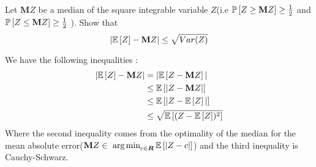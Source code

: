 \begin{exercise}{}
	Let $ \textbf{M}Z $ be a median of the square integrable variable $ Z $(i.e $ \mathbb{P}\left[Z\geq \textbf{M}Z\right] \geq \frac{1}{2} $ and $ \mathbb{P}\left[Z\leq \textbf{M}Z\right] \geq \frac{1}{2}$ ). Show that 
\begin{equation*}
	|\mathbb{E}\left[Z\right] - \textbf{M}Z| \leq \sqrt{Var(Z)}
\end{equation*}
\end{exercise}

\begin{solution}
	We have the following inequalities :
\begin{align*}
	|\mathbb{E}\left[Z\right] - \textbf{M}Z| &= |\mathbb{E}\left[Z - \textbf{M}Z\right]| \\
			       &\leq \mathbb{E}\left[|Z - \textbf{M}Z|\right] \\
			       &\leq \mathbb{E}\left[|Z - \mathbb{E}\left[Z\right]|\right] \\
			       &\leq \sqrt{\mathbb{E}\left[(Z- \mathbb{E}\left[Z\right])^{2}\right]}
\end{align*}
Where the second inequality comes from the optimality of the median for the mean absolute error($ \textbf{M}Z \in \mathop{\mbox{ arg\,min}}_{c\in\boldsymbol{R}} \mathbb{E}\left[|Z-c|\right] $) and the third inequality is Cauchy-Schwarz.
\end{solution}
